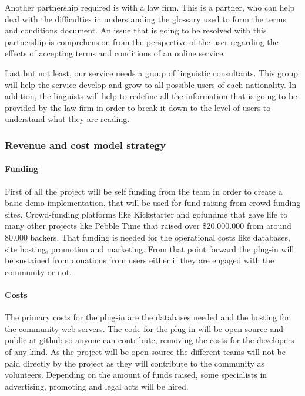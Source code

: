Another partnership required is with a law firm. This is a partner, who can help 
deal with the difficulties in understanding the glossary used to form the terms 
and conditions document. An issue that is going to be resolved with this 
partnership is comprehension from the perspective of the user regarding the 
effects of accepting  terms and conditions of an online service.

Last but not least, our service needs a group of linguistic consultants. This 
group will help the service develop and grow to all possible users of each 
nationality. In addition, the linguists will help to redefine all the 
information that is going to be provided by the law firm in order to break it 
down to the level of users to understand what they are reading.

\subsubsection{Revenue and cost model strategy}

\paragraph{Funding}
First of all the project will be self funding from the team in order to create a 
basic demo implementation, that will be used for fund raising from crowd-funding 
sites. Crowd-funding platforms like Kickstarter and gofundme that 
gave life to many other projects like Pebble Time that raised over \$20.000.000 
from around 80.000 backers. That funding is needed for the operational costs 
like databases, site hosting, promotion and marketing. From that point forward 
the plug-in will be sustained from donations from users either if they are 
engaged with the community or not.

\paragraph{Costs}
The primary costs for the plug-in are the databases needed and the hosting for 
the community web servers. The code for the plug-in will be open source and 
public at github so anyone can contribute, removing the costs for the developers 
of any kind. As the project will be open source the different teams will not be 
paid directly by the project as they will contribute to the community as 
volunteers. Depending on the amount of funds raised, some specialists in 
advertising, promoting and legal acts will be hired.

